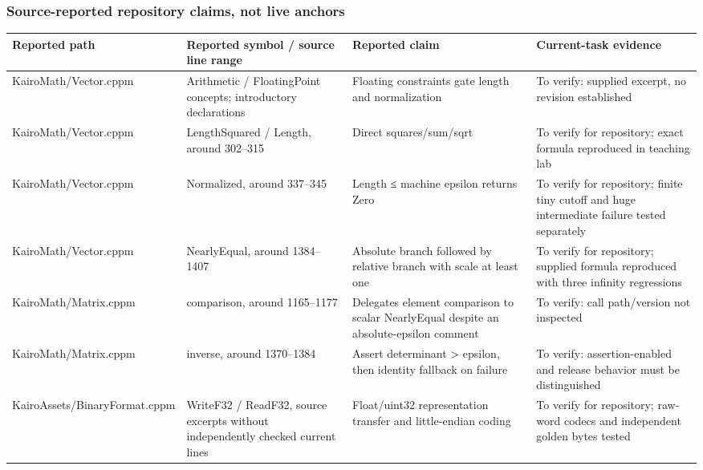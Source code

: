 \subsubsection{Source-reported repository claims, not live anchors}\label{appendix-a103e7846d21-source-reported-repository-claims-not-live-anchors}

{\def\LTcaptype{none} %
\begin{longtable}[]{@{}
  >{\raggedright\arraybackslash}p{}
  >{\raggedright\arraybackslash}p{}
  >{\raggedright\arraybackslash}p{}
  >{\raggedright\arraybackslash}p{}@{}}
\toprule\noalign{}
\begin{minipage}[b]{\linewidth}\raggedright
Reported path
\end{minipage} & \begin{minipage}[b]{\linewidth}\raggedright
Reported symbol / source line range
\end{minipage} & \begin{minipage}[b]{\linewidth}\raggedright
Reported claim
\end{minipage} & \begin{minipage}[b]{\linewidth}\raggedright
Current-task evidence
\end{minipage} \\
\midrule\noalign{}
\endhead
\bottomrule\noalign{}
\endlastfoot
KairoMath/Vector.cppm & Arithmetic / FloatingPoint concepts; introductory declarations & Floating constraints gate length and normalization & To verify: supplied excerpt, no revision established \\
KairoMath/Vector.cppm & LengthSquared / Length, around 302--315 & Direct squares/sum/sqrt & To verify for repository; exact formula reproduced in teaching lab \\
KairoMath/Vector.cppm & Normalized, around 337--345 & Length ≤ machine epsilon returns Zero & To verify for repository; finite tiny cutoff and huge intermediate failure tested separately \\
KairoMath/Vector.cppm & NearlyEqual, around 1384--1407 & Absolute branch followed by relative branch with scale at least one & To verify for repository; supplied formula reproduced with three infinity regressions \\
KairoMath/Matrix.cppm & comparison, around 1165--1177 & Delegates element comparison to scalar NearlyEqual despite an absolute-epsilon comment & To verify: call path/version not inspected \\
KairoMath/Matrix.cppm & inverse, around 1370--1384 & Assert determinant \textgreater{} epsilon, then identity fallback on failure & To verify: assertion-enabled and release behavior must be distinguished \\
KairoAssets/BinaryFormat.cppm & WriteF32 / ReadF32, source excerpts without independently checked current lines & Float/uint32 representation transfer and little-endian coding & To verify for repository; raw-word codecs and independent golden bytes tested \\
\end{longtable}
}

